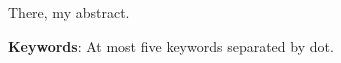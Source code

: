 %
%

\begin{resumo}[Abstract]

There, my abstract.

\textbf{Keywords}: At most five keywords separated by dot.

\end{resumo}
